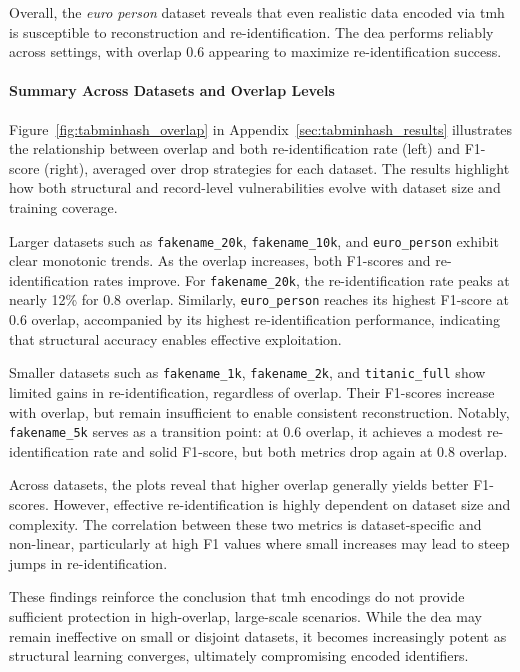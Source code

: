 Overall, the \textit{euro person} dataset reveals that even realistic data encoded via \ac{tmh} is susceptible to reconstruction and re-identification.
The \ac{dea} performs reliably across settings, with overlap 0.6 appearing to maximize re-identification success.


\paragraph{Summary Across Datasets and Overlap Levels}

Figure~\ref{fig:tabminhash_overlap} in Appendix~\ref{sec:tabminhash_results} illustrates the relationship between overlap and both re-identification rate (left) and F1-score (right), averaged over drop strategies for each dataset.
The results highlight how both structural and record-level vulnerabilities evolve with dataset size and training coverage.

Larger datasets such as \texttt{fakename\_20k}, \texttt{fakename\_10k}, and \texttt{euro\_person} exhibit clear monotonic trends.
As the overlap increases, both F1-scores and re-identification rates improve.
For \texttt{fakename\_20k}, the re-identification rate peaks at nearly 12\% for 0.8 overlap.
Similarly, \texttt{euro\_person} reaches its highest F1-score at 0.6 overlap, accompanied by its highest re-identification performance, indicating that structural accuracy enables effective exploitation.

Smaller datasets such as \texttt{fakename\_1k}, \texttt{fakename\_2k}, and \texttt{titanic\_full} show limited gains in re-identification, regardless of overlap.
Their F1-scores increase with overlap, but remain insufficient to enable consistent reconstruction.
Notably, \texttt{fakename\_5k} serves as a transition point: at 0.6 overlap, it achieves a modest re-identification rate and solid F1-score, but both metrics drop again at 0.8 overlap.

Across datasets, the plots reveal that higher overlap generally yields better F1-scores.
However, effective re-identification is highly dependent on dataset size and complexity.
The correlation between these two metrics is dataset-specific and non-linear, particularly at high F1 values where small increases may lead to steep jumps in re-identification.

These findings reinforce the conclusion that \ac{tmh} encodings do not provide sufficient protection in high-overlap, large-scale scenarios.
While the \ac{dea} may remain ineffective on small or disjoint datasets, it becomes increasingly potent as structural learning converges, ultimately compromising encoded identifiers.

